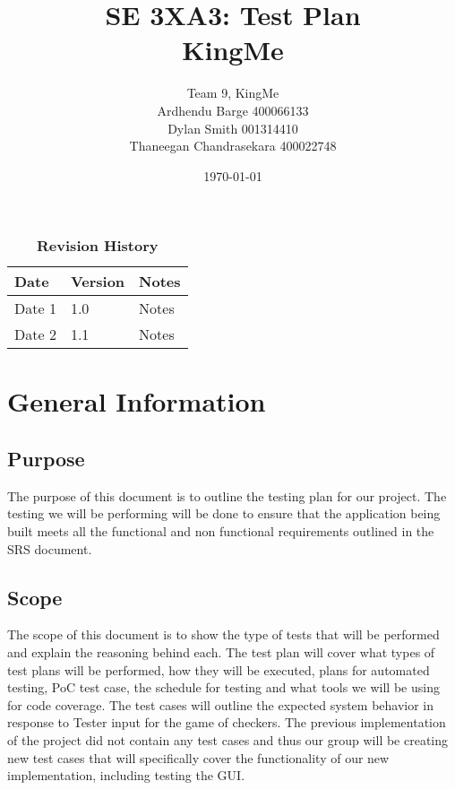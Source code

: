 \documentclass[12pt, titlepage]{article}
\title{SE 3XA3: Test Plan\\KingMe}
\author{Team 9, KingMe
		\\ Ardhendu Barge 400066133
		\\ Dylan Smith 001314410
		\\ Thaneegan Chandrasekara 400022748
}
\date{\today}
\begin{document}
\maketitle

\tableofcontents
\listoftables
\listoffigures

\begin{table}[bp]
\caption{\bf Revision History}
\begin{tabularx}{\textwidth}{p{3cm}p{2cm}X}
\toprule {\bf Date} & {\bf Version} & {\bf Notes}\\
\midrule
Date 1 & 1.0 & Notes\\
Date 2 & 1.1 & Notes\\
\bottomrule
\end{tabularx}
\end{table}

\newpage


\section{General Information}

\subsection{Purpose}
The purpose of this document is to outline the testing plan for our project. The testing we will be performing will be done to ensure that the application being built meets all the functional and non functional requirements outlined in the SRS document. 

\subsection{Scope}
The scope of this document is to show the type of tests that will be performed and explain the reasoning behind each. The test plan will cover what types of test plans will be performed, how they will be executed, plans for automated testing, PoC test case, the schedule for testing and what tools we will be using for code coverage. The test cases will outline the expected system behavior in response to Tester input for the game of checkers. The previous implementation of the project did not contain any test cases and thus our group will be creating new test cases that will specifically cover the functionality of our new implementation, including testing the GUI.
\end{document}
